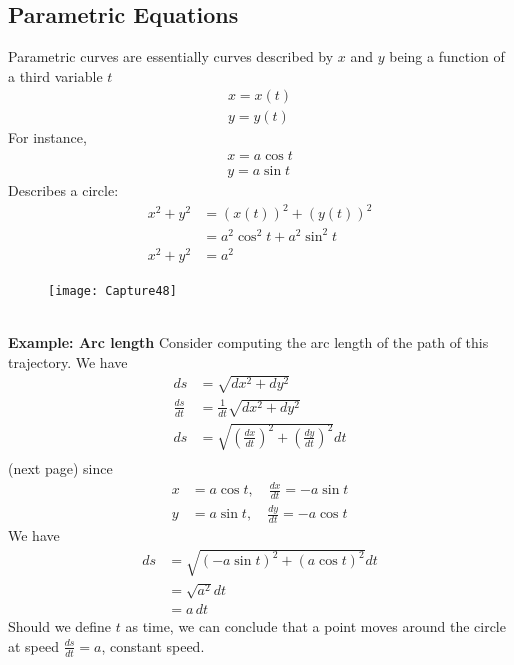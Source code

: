 \documentclass{report}
\begin{document}
\subsection{Parametric Equations} %
Parametric curves are essentially curves described by $x$ and $y$ being a function of a third 
variable $t$
\begin{align*}
x=x(t)\\
y=y(t)
\end{align*}
For instance, 
\begin{align*}
x=a\cos t\\
y=a\sin t
\end{align*}
Describes a circle:
\begin{align*}
x^2+y^2&=(x(t))^2+(y(t))^2\\
&=a^2\cos^2t+a^2\sin^2t\\
x^2+y^2&=a^2
\end{align*}
\begin{figure}[h]
\texttt{[image: Capture48]}\\
\centering
{}
\end{figure}\\
\textbf{Example: Arc length}
Consider computing the arc length of the path of this trajectory. We have
\begin{align*}
ds&=\sqrt{dx^2+dy^2}\\
\frac{ds}{dt}&=\frac{1}{dt}\sqrt{dx^2+dy^2}\\
ds&=\sqrt{\left(\frac{dx}{dt}\right)^2+\left(\frac{dy}{dt}\right)^2}dt\\
\end{align*}
(next page)
\newpage
\noindent since
\begin{align*}
x&=a\cos t,\quad\frac{dx}{dt}=-a\sin t\\
y&=a\sin t,\quad\frac{dy}{dt}=-a\cos t
\end{align*}
We have
\begin{align*}
ds&=\sqrt{(-a\sin t)^2+(a\cos t)^2}dt\\
&=\sqrt{a^2}dt\\
&=a\,dt
\end{align*}
Should we define $t$ as time, we can conclude that a point moves
around the circle at speed $\frac{ds}{dt}=a$, constant speed.
\newpage
\end{document}
